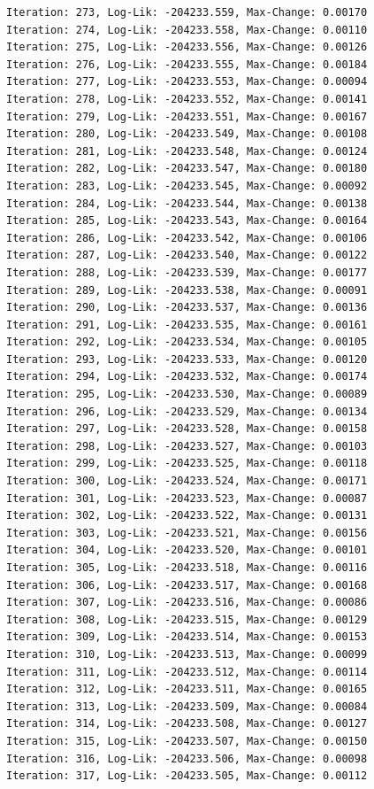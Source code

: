 \documentclass[
  letterpaper,
  DIV=11,
  numbers=noendperiod]{scrreport}
\begin{document}
\begin{verbatim}
Iteration: 273, Log-Lik: -204233.559, Max-Change: 0.00170
Iteration: 274, Log-Lik: -204233.558, Max-Change: 0.00110
Iteration: 275, Log-Lik: -204233.556, Max-Change: 0.00126
Iteration: 276, Log-Lik: -204233.555, Max-Change: 0.00184
Iteration: 277, Log-Lik: -204233.553, Max-Change: 0.00094
Iteration: 278, Log-Lik: -204233.552, Max-Change: 0.00141
Iteration: 279, Log-Lik: -204233.551, Max-Change: 0.00167
Iteration: 280, Log-Lik: -204233.549, Max-Change: 0.00108
Iteration: 281, Log-Lik: -204233.548, Max-Change: 0.00124
Iteration: 282, Log-Lik: -204233.547, Max-Change: 0.00180
Iteration: 283, Log-Lik: -204233.545, Max-Change: 0.00092
Iteration: 284, Log-Lik: -204233.544, Max-Change: 0.00138
Iteration: 285, Log-Lik: -204233.543, Max-Change: 0.00164
Iteration: 286, Log-Lik: -204233.542, Max-Change: 0.00106
Iteration: 287, Log-Lik: -204233.540, Max-Change: 0.00122
Iteration: 288, Log-Lik: -204233.539, Max-Change: 0.00177
Iteration: 289, Log-Lik: -204233.538, Max-Change: 0.00091
Iteration: 290, Log-Lik: -204233.537, Max-Change: 0.00136
Iteration: 291, Log-Lik: -204233.535, Max-Change: 0.00161
Iteration: 292, Log-Lik: -204233.534, Max-Change: 0.00105
Iteration: 293, Log-Lik: -204233.533, Max-Change: 0.00120
Iteration: 294, Log-Lik: -204233.532, Max-Change: 0.00174
Iteration: 295, Log-Lik: -204233.530, Max-Change: 0.00089
Iteration: 296, Log-Lik: -204233.529, Max-Change: 0.00134
Iteration: 297, Log-Lik: -204233.528, Max-Change: 0.00158
Iteration: 298, Log-Lik: -204233.527, Max-Change: 0.00103
Iteration: 299, Log-Lik: -204233.525, Max-Change: 0.00118
Iteration: 300, Log-Lik: -204233.524, Max-Change: 0.00171
Iteration: 301, Log-Lik: -204233.523, Max-Change: 0.00087
Iteration: 302, Log-Lik: -204233.522, Max-Change: 0.00131
Iteration: 303, Log-Lik: -204233.521, Max-Change: 0.00156
Iteration: 304, Log-Lik: -204233.520, Max-Change: 0.00101
Iteration: 305, Log-Lik: -204233.518, Max-Change: 0.00116
Iteration: 306, Log-Lik: -204233.517, Max-Change: 0.00168
Iteration: 307, Log-Lik: -204233.516, Max-Change: 0.00086
Iteration: 308, Log-Lik: -204233.515, Max-Change: 0.00129
Iteration: 309, Log-Lik: -204233.514, Max-Change: 0.00153
Iteration: 310, Log-Lik: -204233.513, Max-Change: 0.00099
Iteration: 311, Log-Lik: -204233.512, Max-Change: 0.00114
Iteration: 312, Log-Lik: -204233.511, Max-Change: 0.00165
Iteration: 313, Log-Lik: -204233.509, Max-Change: 0.00084
Iteration: 314, Log-Lik: -204233.508, Max-Change: 0.00127
Iteration: 315, Log-Lik: -204233.507, Max-Change: 0.00150
Iteration: 316, Log-Lik: -204233.506, Max-Change: 0.00098
Iteration: 317, Log-Lik: -204233.505, Max-Change: 0.00112

\end{verbatim}
\end{document}
